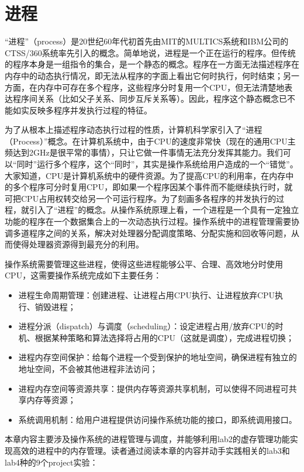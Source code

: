 \chapter{进程}\label{ch_process}

``进程''（process）是20世纪60年代初首先由MIT的MULTICS系统和IBM公司的CTSS/360系统率先引入的概念。简单地说，进程是一个正在运行的程序。但传统的程序本身是一组指令的集合，是一个静态的概念。程序在一方面无法描述程序在内存中的动态执行情况，即无法从程序的字面上看出它何时执行，何时结束；另一方面，在内存中可存在多个程序，这些程序分时复用一个CPU，但无法清楚地表达程序间关系（比如父子关系、同步互斥关系等）。因此，程序这个静态概念已不能如实反映多程序并发执行过程的特征。

为了从根本上描述程序动态执行过程的性质，计算机科学家引入了``进程（Process）''概念。在计算机系统中，由于CPU的速度非常快（现在的通用CPU主频达到2GHz是很平常的事情），只让它做一件事情无法充分发挥其能力。我们可以``同时''运行多个程序，这个``同时''，其实是操作系统给用户造成的一个``错觉''。大家知道，CPU是计算机系统中的硬件资源。为了提高CPU的利用率，在内存中的多个程序可分时复用CPU，即如果一个程序因某个事件而不能继续执行时，就可把CPU占用权转交给另一个可运行程序。为了刻画多各程序的并发执行的过程，就引入了``进程''的概念。从操作系统原理上看，一个进程是一个具有一定独立功能的程序在一个数据集合上的一次动态执行过程。操作系统中的进程管理需要协调多道程序之间的关系，解决对处理器分配调度策略、分配实施和回收等问题，从而使得处理器资源得到最充分的利用。

操作系统需要管理这些进程，使得这些进程能够公平、合理、高效地分时使用CPU，这需要操作系统完成如下主要任务：

\begin{itemize}
\item
  进程生命周期管理：创建进程、让进程占用CPU执行、让进程放弃CPU执行、销毁进程；
\item
  进程分派（dispatch）与调度（scheduling）：设定进程占用/放弃CPU的时机、根据某种策略和算法选择将占用的CPU（这就是调度），完成进程切换；
\item
  进程内存空间保护：给每个进程一个受到保护的地址空间，确保进程有独立的地址空间，不会被其他进程非法访问；
\item
  进程内存空间等资源共享：提供内存等资源共享机制，可以使得不同进程可共享内存等资源；
\item
  系统调用机制：给用户进程提供访问操作系统功能的接口，即系统调用接口。
\end{itemize}

本章内容主要涉及操作系统的进程管理与调度，并能够利用lab2的虚存管理功能实现高效的进程中的内存管理。读者通过阅读本章的内容并动手实践相关的lab3和lab4种的9个project实验：

